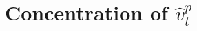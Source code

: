 \documentclass[letterpaper]{article} %
\def\V{\mathbb{V}}
\begin{document}




\section{Concentration of $\hat{v}_t^p$}
\label{apdix:bound}
\end{document}
